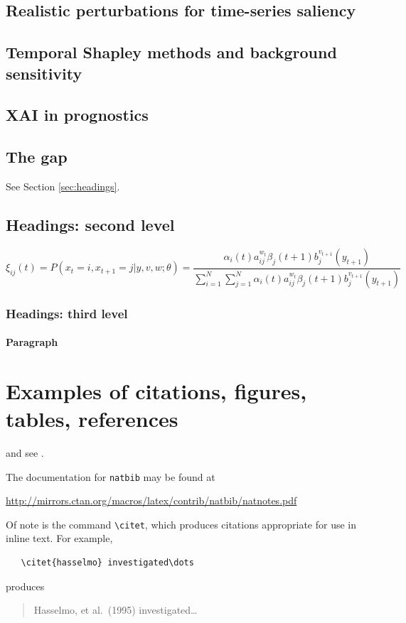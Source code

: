 \documentclass{article}
\begin{document}
\subsection{Realistic perturbations for time-series saliency}\label{sec:related:ts}

\subsection{Temporal Shapley methods and background sensitivity}\label{sec:related:tshap}

\subsection{XAI in prognostics}\label{sec:related:phm}

\subsection{The gap}\label{sec:related:gap}

\lipsum[4] See Section \ref{sec:headings}.

\subsection{Headings: second level}
\lipsum[5]
\begin{equation}
\xi _{ij}(t)=P(x_{t}=i,x_{t+1}=j|y,v,w;\theta)= {\frac {\alpha _{i}(t)a^{w_t}_{ij}\beta _{j}(t+1)b^{v_{t+1}}_{j}(y_{t+1})}{\sum _{i=1}^{N} \sum _{j=1}^{N} \alpha _{i}(t)a^{w_t}_{ij}\beta _{j}(t+1)b^{v_{t+1}}_{j}(y_{t+1})}}
\end{equation}

\subsubsection{Headings: third level}
\lipsum[6]

\paragraph{Paragraph}
\lipsum[7]

\section{Examples of citations, figures, tables, references}
\label{sec:others}
\lipsum[8] \cite{kour2014real,kour2014fast} and see \cite{hadash2018estimate}.

The documentation for \verb+natbib+ may be found at
\begin{center}
  \url{http://mirrors.ctan.org/macros/latex/contrib/natbib/natnotes.pdf}
\end{center}
Of note is the command \verb+\citet+, which produces citations
appropriate for use in inline text.  For example,
\begin{verbatim}
   \citet{hasselmo} investigated\dots
\end{verbatim}
produces
\begin{quote}
  Hasselmo, et al.\ (1995) investigated\dots
\end{quote}
\end{document}
